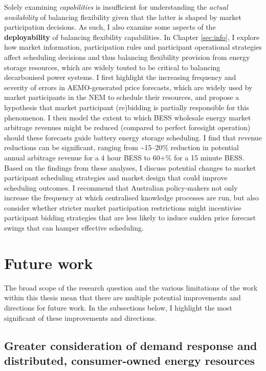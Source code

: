 \documentclass[12pt,a4paper,]{report}
\begin{document}
Solely examining \emph{capabilities} is insufficient for understanding
the \emph{actual availability} of balancing flexibility given that the
latter is shaped by market participation decisions. As such, I also
examine some aspects of the \textbf{deployability} of balancing
flexibility capabilities. In Chapter \ref{sec:info}, I explore how
market information, participation rules and participant operational
strategies affect scheduling decisions and thus balancing flexibility
provision from energy storage resources, which are widely touted to be
critical to balancing decarbonised power systems. I first highlight the
increasing frequency and severity of errors in AEMO-generated price
forecasts, which are widely used by market participants in the NEM to
schedule their resources, and propose a hypothesis that market
participant (re)bidding is partially responsible for this phenomenon. I
then model the extent to which BESS wholesale energy market arbitrage
revenues might be reduced (compared to perfect foresight operation)
should these forecasts guide battery energy storage scheduling. I find
that revenue reductions can be significant, ranging from
\textasciitilde15--20\% reduction in potential annual arbitrage revenue
for a 4 hour BESS to 60+\% for a 15 minute BESS. Based on the findings
from these analyses, I discuss potential changes to market participant
scheduling strategies and market design that could improve scheduling
outcomes. I recommend that Australian policy-makers not only increase
the frequency at which centralised knowledge processes are run, but also
consider whether stricter market participation restrictions might
incentivise participant bidding strategies that are less likely to
induce sudden price forecast swings that can hamper effective
scheduling.

\hypertarget{sec:conclusion-future_work}{%
\section{Future work}\label{sec:conclusion-future_work}}

The broad scope of the research question and the various limitations of
the work within this thesis mean that there are multiple potential
improvements and directions for future work. In the subsections below, I
highlight the most significant of these improvements and directions.

\hypertarget{greater-consideration-of-demand-response-and-distributed-consumer-owned-energy-resources}{%
\subsection{Greater consideration of demand response and distributed,
consumer-owned energy
resources}\label{greater-consideration-of-demand-response-and-distributed-consumer-owned-energy-resources}}
\end{document}
